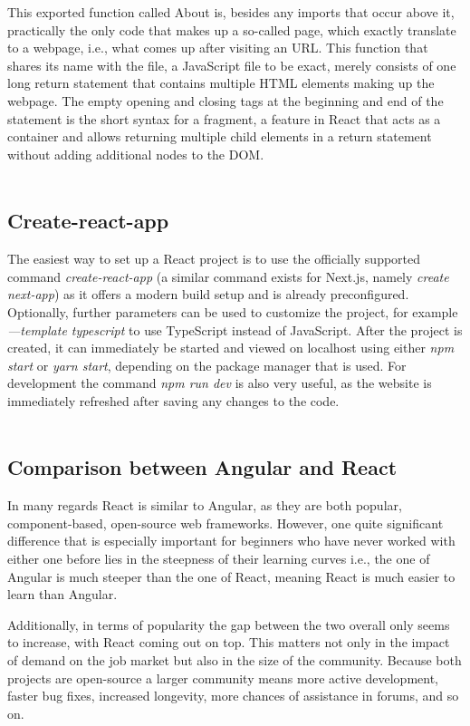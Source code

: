 This exported function called About is, besides any imports that occur above it, practically the only code that makes 
up a so-called page, which exactly translate to a webpage, i.e., what comes up after visiting an URL. This function 
that shares its name with the file, a JavaScript file to be exact, merely consists of one long return statement that 
contains multiple HTML elements making up the webpage. \cite{ReactJSX}
The empty opening and closing tags at the beginning and end of the statement is the short syntax for a fragment, a 
feature in React that acts as a container and allows returning multiple child elements in a return statement 
without adding additional nodes to the DOM. \cite{ReactFragments}
\\
\\
\subsection{Create-react-app}
The easiest way to set up a React project is to use the officially supported command \emph{create-react-app}
(a similar command exists for Next.js, namely \emph{create next-app}) as it offers a modern build setup and is already preconfigured. 
Optionally, further parameters can be used to customize the project, for example \emph{—template typescript} to use TypeScript 
instead of JavaScript. After the project is created, it can immediately be started and viewed on localhost using either 
\emph{npm start} or \emph{yarn start}, depending on the package manager that is used. For development the command \emph{npm run dev} is 
also very useful, as the website is immediately refreshed after saving any changes to the code. \cite{create-react}
\\
\\
\subsection{Comparison between Angular and React}
In many regards React is similar to Angular, as they are both popular, component-based, open-source web frameworks. However, one 
quite significant difference that is especially important for beginners who have never worked with either one before lies in the 
steepness of their learning curves i.e., the one of Angular is much steeper than the one of React, meaning React is much easier 
to learn than Angular.

Additionally, in terms of popularity the gap between the two overall only seems to increase, with React coming out on top. This 
matters not only in the impact of demand on the job market but also in the size of the community. Because both projects are 
open-source a larger community means more active development, faster bug fixes, increased longevity, more chances of assistance 
in forums, and so on.

